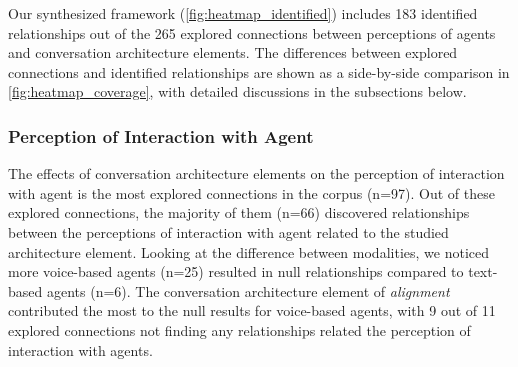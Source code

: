 Our synthesized framework (\autoref{fig:heatmap_identified}) includes 183 identified relationships out of the 265 explored connections between perceptions of agents and conversation architecture elements. The differences between explored connections and identified relationships are shown as a side-by-side comparison in \autoref{fig:heatmap_coverage}, with detailed discussions in the subsections below.





\subsubsection{Perception of Interaction with Agent}

The effects of conversation architecture elements on the perception of interaction with agent is the most explored connections in the corpus (n=97). Out of these explored connections, the majority of them (n=66) discovered relationships between the perceptions of interaction with agent related to the studied architecture element. Looking at the difference between modalities, we noticed more voice-based agents (n=25) resulted in null relationships compared to text-based agents (n=6). The conversation architecture element of \textit{alignment} contributed the most to the null results for voice-based agents, with 9 out of 11 explored connections not finding any relationships related the perception of interaction with agents.

